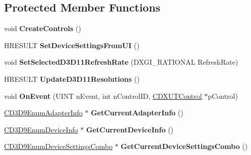 \subsection*{Protected Member Functions}
\begin{DoxyCompactItemize}
\item 
\hypertarget{class_c_d3_d_settings_dlg_ab4f8f21e9d8db02fafb03c346cee8eea}{void {\bfseries Create\+Controls} ()}\label{class_c_d3_d_settings_dlg_ab4f8f21e9d8db02fafb03c346cee8eea}

\item 
\hypertarget{class_c_d3_d_settings_dlg_a12d42c7cb4fc734538eeafff7d979215}{H\+R\+E\+S\+U\+L\+T {\bfseries Set\+Device\+Settings\+From\+U\+I} ()}\label{class_c_d3_d_settings_dlg_a12d42c7cb4fc734538eeafff7d979215}

\item 
\hypertarget{class_c_d3_d_settings_dlg_a0884bb7602454e1e424b8469d6bbf4fa}{void {\bfseries Set\+Selected\+D3\+D11\+Refresh\+Rate} (D\+X\+G\+I\+\_\+\+R\+A\+T\+I\+O\+N\+A\+L Refresh\+Rate)}\label{class_c_d3_d_settings_dlg_a0884bb7602454e1e424b8469d6bbf4fa}

\item 
\hypertarget{class_c_d3_d_settings_dlg_af3be291c230dba3dc134c3d10afc0181}{H\+R\+E\+S\+U\+L\+T {\bfseries Update\+D3\+D11\+Resolutions} ()}\label{class_c_d3_d_settings_dlg_af3be291c230dba3dc134c3d10afc0181}

\item 
\hypertarget{class_c_d3_d_settings_dlg_a8ba617f0440a4647d0697e0dadb373b4}{void {\bfseries On\+Event} (U\+I\+N\+T n\+Event, int n\+Control\+I\+D, \hyperlink{class_c_d_x_u_t_control}{C\+D\+X\+U\+T\+Control} $\ast$p\+Control)}\label{class_c_d3_d_settings_dlg_a8ba617f0440a4647d0697e0dadb373b4}

\item 
\hypertarget{class_c_d3_d_settings_dlg_a50970f3084c04eecace8828d3d5165d3}{\hyperlink{class_c_d3_d9_enum_adapter_info}{C\+D3\+D9\+Enum\+Adapter\+Info} $\ast$ {\bfseries Get\+Current\+Adapter\+Info} ()}\label{class_c_d3_d_settings_dlg_a50970f3084c04eecace8828d3d5165d3}

\item 
\hypertarget{class_c_d3_d_settings_dlg_a35d24cfabe5d11adfe7ff88877b98102}{\hyperlink{class_c_d3_d9_enum_device_info}{C\+D3\+D9\+Enum\+Device\+Info} $\ast$ {\bfseries Get\+Current\+Device\+Info} ()}\label{class_c_d3_d_settings_dlg_a35d24cfabe5d11adfe7ff88877b98102}

\item 
\hypertarget{class_c_d3_d_settings_dlg_a4309ae54cb7451ed53d9b49eca11467a}{\hyperlink{struct_c_d3_d9_enum_device_settings_combo}{C\+D3\+D9\+Enum\+Device\+Settings\+Combo} $\ast$ {\bfseries Get\+Current\+Device\+Settings\+Combo} ()}\label{class_c_d3_d_settings_dlg_a4309ae54cb7451ed53d9b49eca11467a}


\end{DoxyCompactItemize}
